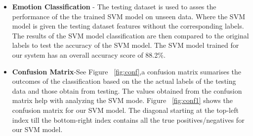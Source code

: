 \begin{itemize}
\item \textbf{Emotion Classification} - The testing dataset is used to asses the performance of the the trained SVM model on unseen data. Where the SVM model is given the testing dataset features without the corresponding labels. The results of the SVM model classification are then compared to the original labels to test the accuracy of the SVM model. The SVM model trained for our system has an overall accuracy score of 88.2\%.\\
\item \textbf{Confusion Matrix}-See Figure ~\ref{fig:conf},a confusion matrix sumarises the outcomes of the classification based on the the actual labels of the testing data and those obtain from testing. The values obtained from the confusion matrix help with analyzing the SVM mode. Figure ~\ref{fig:conf1} shows the confusion matrix for our SVM model. The diagonal starting at the top-left index till the bottom-right index contains all the true positives/negatives for our SVM model.


\end{itemize}
